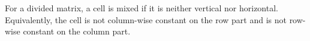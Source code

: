 For a divided matrix, a cell is mixed if it is neither vertical nor
horizontal.  Equivalently, the cell is not column-wise constant on the row
part and is not row-wise constant on the column part.
